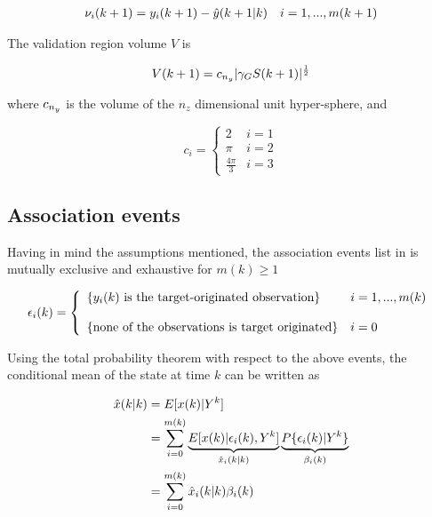 $$\begin{aligned}
\nu_i(k+1) = {y}_i(k+1) - {\hat{{y}}}(k+1|k)  && i= 1, ...,m(k+1)
\end{aligned}
$$


The validation region volume $V$ is

$$V(k+1) = c_{n_{{y}}}|{\gamma_G} S(k+1)|^\frac{1}{2}$$

where $c_{n_{y}}$ is the volume of the $n_z$ dimensional unit hyper-sphere, and


\begin{equation}\label{eq:ndimensionalvolume}
c_i =
\left\{\begin{array}{ll}
2  & i = 1 \\
\pi & i=2 \\
\frac{4\pi}{3} & i = 3
\end{array}
\right.
\end{equation}


\subsection{Association events}
Having in mind the assumptions mentioned, the association events list in  is mutually exclusive and exhaustive for $m(k)\geq1$

\begin{equation}\label{eq:associationevents}
\epsilon_i(k)  = \left\{
\begin{array}{ll}
\{{y}_i(k) \text{ is the target-originated observation} \} & i = 1,...,m(k) \\
\\
\{\text{none of the observations is target originated} \} & i=0
\end{array}\right.
\end{equation}

Using the total probability theorem with respect to the above events, the conditional mean of the state at time $k$ can be written as

\begin{equation}\label{eq:conditionalmean}
\begin{split}
\hat{x}(k|k) &= E[x(k)|{Y}^k] \\
&= \sum_{i=0}^{m(k)} \underbrace{E[x(k)|\epsilon_i(k),{Y}^k]}_{\hat{x}_i(k|k)} \underbrace{P\{\epsilon_i(k)|{Y}^k\}}_{\beta_i(k)}\\
&=\sum_{i=0}^{m(k)} \hat{x}_i(k|k) \beta_i(k)
\end{split}
\end{equation}
 
